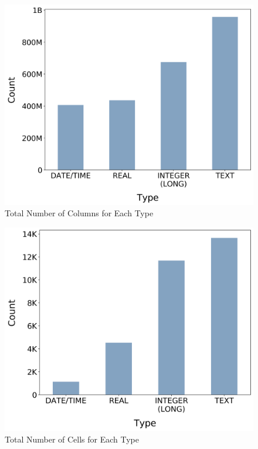 \documentclass[sigconf,authordraft]{acmart}
\begin{document}
\begin{figure}[h]
  \centering
  \includegraphics[width=\linewidth]{tot_cols_for_each_type.png}
  \caption{Total Number of Columns for Each Type}
\end{figure}



\begin{figure}[h]
  \centering
  \includegraphics[width=\linewidth]{tot_cells_for_each_type.png}
  \caption{Total Number of Cells for Each Type}
\end{figure}
\end{document}
